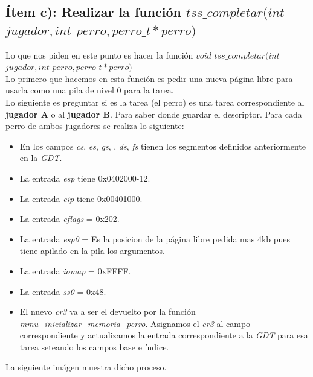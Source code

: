 \subsection{Ítem c): Realizar la función $tss\_completar(int$ $jugador, int$ $perro, perro\_t *perro)$}
Lo que nos piden en este punto es hacer la función $void$ $tss\_completar(int$ $jugador, int$ $perro, perro\_t *perro)$\\
Lo primero que  hacemos en esta función es pedir una nueva página libre para usarla como una pila de nivel 0 para la tarea.\\
Lo siguiente es preguntar si es la tarea (el perro) es una tarea correspondiente al \textbf{jugador A} o al \textbf{jugador B}. Para saber donde guardar el descriptor. Para cada perro de ambos jugadores se realiza lo siguiente:
\begin{itemize}

\item En los campos \textit{cs}, \textit{es}, \textit{gs}, , \textit{ds}, \textit{fs} tienen los segmentos definidos anteriormente en la \textit{GDT}.\\
\item La entrada \textit{esp} tiene 0x0402000-12.
\item La entrada \textit{eip} tiene 0x00401000.
\item La entrada \textit{eflags} = 0x202.
\item La entrada \textit{esp0} = Es la posicion de la página libre pedida mas 4kb pues tiene apilado en la pila los argumentos.
\item La entrada \textit{iomap} = 0xFFFF.
\item La entrada \textit{ss0} = 0x48.
\item El nuevo \textit{cr3} va a ser el devuelto por la función \textit{mmu\_inicializar\_memoria\_perro}. Asignamos el \textit{cr3}  al campo correspondiente y actualizamos la entrada correspondiente a la \textit{GDT} para esa tarea seteando los campos base e índice.
\end{itemize}

La siguiente imágen muestra dicho proceso.\\

